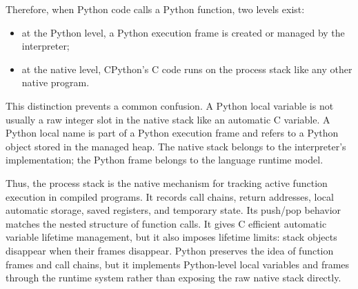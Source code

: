 Therefore, when Python code calls a Python function, two levels exist:

\begin{itemize}
    \item at the Python level, a Python execution frame is created or managed by the interpreter;
    \item at the native level, CPython's C code runs on the process stack like any other native program.
\end{itemize}

This distinction prevents a common confusion. A Python local variable is not usually a raw integer slot in the native stack like an automatic C variable. A Python local name is part of a Python execution frame and refers to a Python object stored in the managed heap. The native stack belongs to the interpreter's implementation; the Python frame belongs to the language runtime model.

Thus, the process stack is the native mechanism for tracking active function execution in compiled programs. It records call chains, return addresses, local automatic storage, saved registers, and temporary state. Its push/pop behavior matches the nested structure of function calls. It gives C efficient automatic variable lifetime management, but it also imposes lifetime limits: stack objects disappear when their frames disappear. Python preserves the idea of function frames and call chains, but it implements Python-level local variables and frames through the runtime system rather than exposing the raw native stack directly.